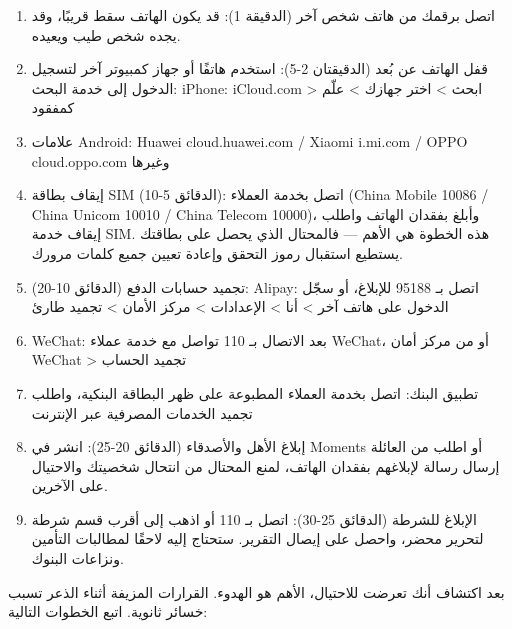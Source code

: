 \begin{enumerate}
  \item اتصل برقمك من هاتف شخص آخر (الدقيقة 1): قد يكون الهاتف سقط قريبًا، وقد يجده شخص طيب ويعيده.
  \item قفل الهاتف عن بُعد (الدقيقتان 2-5): استخدم هاتفًا أو جهاز كمبيوتر آخر لتسجيل الدخول إلى خدمة البحث: iPhone: iCloud.com > ابحث > اختر جهازك > علّم كمفقود
  \item علامات Android: Huawei cloud.huawei.com / Xiaomi i.mi.com / OPPO cloud.oppo.com وغيرها
  \item إيقاف بطاقة SIM (الدقائق 5-10): اتصل بخدمة العملاء (China Mobile 10086 / China Unicom 10010 / China Telecom 10000)، وأبلغ بفقدان الهاتف واطلب إيقاف خدمة SIM. هذه الخطوة هي الأهم — فالمحتال الذي يحصل على بطاقتك يستطيع استقبال رموز التحقق وإعادة تعيين جميع كلمات مرورك.
  \item تجميد حسابات الدفع (الدقائق 10-20): Alipay: اتصل بـ 95188 للإبلاغ، أو سجّل الدخول على هاتف آخر > أنا > الإعدادات > مركز الأمان > تجميد طارئ
  \item WeChat: بعد الاتصال بـ 110 تواصل مع خدمة عملاء WeChat، أو من مركز أمان WeChat > تجميد الحساب
  \item تطبيق البنك: اتصل بخدمة العملاء المطبوعة على ظهر البطاقة البنكية، واطلب تجميد الخدمات المصرفية عبر الإنترنت
  \item إبلاغ الأهل والأصدقاء (الدقائق 20-25): انشر في Moments أو اطلب من العائلة إرسال رسالة لإبلاغهم بفقدان الهاتف، لمنع المحتال من انتحال شخصيتك والاحتيال على الآخرين.
  \item الإبلاغ للشرطة (الدقائق 25-30): اتصل بـ 110 أو اذهب إلى أقرب قسم شرطة لتحرير محضر، واحصل على إيصال التقرير. ستحتاج إليه لاحقًا لمطالبات التأمين ونزاعات البنوك.
\end{enumerate}


بعد اكتشاف أنك تعرضت للاحتيال، الأهم هو الهدوء. القرارات المزيفة أثناء الذعر تسبب خسائر ثانوية. اتبع الخطوات التالية:


